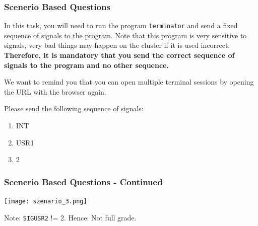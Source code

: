 \begin{frame}
  \frametitle{Scenerio Based Questions}

\begin{tcolorbox}[colback=gray!5,colframe=green!40!black,title=Here:]
\footnotesize
In this task, you will need to run the program \texttt{terminator} and send a fixed sequence of signals to the program.
Note that this program is very sensitive to signals, very bad things may happen on the cluster if it is used incorrect. \textbf{Therefore, it is mandatory that you send the correct sequence of signals to the program and no other sequence.} 

We want to remind you that you can open multiple terminal sessions by opening the URL with the browser again.

Please send the following sequence of signals: 
\begin{enumerate}
  \item INT
  \item USR1
  \item 2
\end{enumerate}
\end{tcolorbox}

\end{frame}

\begin{frame}
  \frametitle{Scenerio Based Questions - Continued}
  \centering
  \texttt{[image: szenario\_3.png]}

  Note: \texttt{SIGUSR2} != 2. Hence: Not full grade.
\end{frame}


% 
%       
% 
%       
%   






